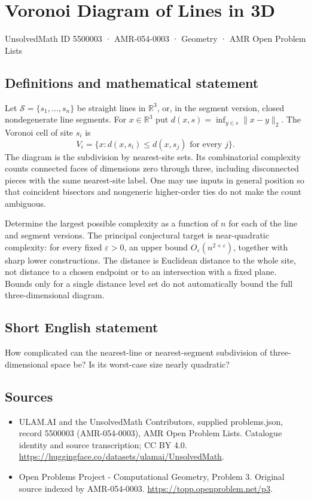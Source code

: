 \documentclass[11pt,a4paper]{article}
\begin{document}
\section*{Voronoi Diagram of Lines in 3D}\label{5500003}
{\small UnsolvedMath ID 5500003 · AMR-054-0003 · Geometry · AMR Open Problem Lists}
\subsection{Definitions and mathematical statement}
Let $\mathcal S=\{s_1,\ldots,s_n\}$ be straight lines in $\mathbb R^3$,
or, in the segment version, closed nondegenerate line segments. For
$x\in\mathbb R^3$ put $d(x,s)=\inf_{y\in s}\|x-y\|_2$. The Voronoi cell
of site $s_i$ is
\[
 V_i=\{x:d(x,s_i)\le d(x,s_j)\text{ for every }j\}.
\]
The diagram is the subdivision by nearest-site sets. Its combinatorial
complexity counts connected faces of dimensions zero through three,
including disconnected pieces with the same nearest-site label. One
may use inputs in general position so that coincident bisectors and
nongeneric higher-order ties do not make the count ambiguous.

Determine the largest possible complexity as a function of $n$ for each
of the line and segment versions. The principal conjectural target is
near-quadratic complexity: for every fixed $\varepsilon>0$, an upper bound
$O_\varepsilon(n^{2+\varepsilon})$, together with sharp lower constructions.
The distance is Euclidean distance to the whole site, not distance to a
chosen endpoint or to an intersection with a fixed plane. Bounds only
for a single distance level set do not automatically bound the full
three-dimensional diagram.
\subsection{Short English statement}
How complicated can the nearest-line or nearest-segment subdivision of
three-dimensional space be? Is its worst-case size nearly quadratic?
\subsection{Sources}
\begin{itemize}
\item[S1] ULAM.AI and the UnsolvedMath Contributors, supplied problems.json, record 5500003 (AMR-054-0003), AMR Open Problem Lists. Catalogue identity and source transcription; CC BY 4.0.
\url{https://huggingface.co/datasets/ulamai/UnsolvedMath}.
\item[S2] Open Problems Project - Computational Geometry, Problem 3. Original source indexed by AMR-054-0003.
\url{https://topp.openproblem.net/p3}.
\end{itemize}
\end{document}
